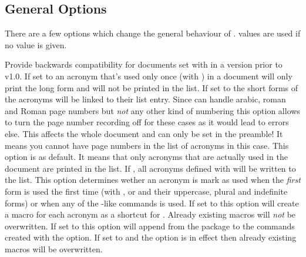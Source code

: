 \documentclass[DIV10,toc=index,toc=bib,hyperfootnotes=false]{cnpkgdoc}
\makeatletter
\providecommand*\sinceversion[1]{%
  \@bsphack
  \marginnote{%
    \footnotesize\sffamily\RaggedRight
    \textcolor{black!75}{Introduced in version~#1}}%
  \@esphack}
\makeatother
\begin{document}
\subsection{General Options}
There are a few options which change the general behaviour of \acro.
 values are used if no value is given.
\begin{beschreibung}
   Provide backwards compatibility for documents set with \acro in a version
   prior to v1.0.
   If set to  an acronym that's used only once (with ) in a
   document will only print the long form and will not be printed in the list.
   If set to  the short forms of the acronyms will be linked to their
   list entry.
   Since \acro can handle arabic, roman and Roman page numbers but \emph{not}
   any other kind of numbering this option allows to turn the page number
   recording off for these cases as it would lead to errors else. This affects
   the whole document and can only be set in the preamble! It means you cannot
   have page numbers in the list of acronyms in this case.
   This option is  as default. It means that only acronyms that are
   actually used in the document are printed in the list. If , all
   acronyms defined with  will be written to the list.
   \sinceversion{1.2}%
   This option determines wether an acronym is mark as used when the \emph{first}
   form is used the first time (with ,  or  and
   their uppercase, plural and indefinite forms) or when any of the -like
   commands is used.   
   If set to  this option will create a macro  for each
   acronym as a shortcut for .  Already existing macros will
   \emph{not} be overwritten.
   \sinceversion{0.6}If set to  this option will append 
   from the  package to the commands created with the 
   option.
   If set to  and the option  is in effect then
   already existing macros will be overwritten.

\end{beschreibung}
\end{document}
